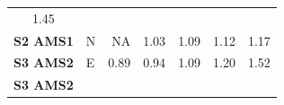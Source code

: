 \documentclass[]{article}
\begin{document}
\begin{longtable}[]{@{}clrrrrr@{}}
\begin{minipage}[t]{0.08\columnwidth}
1.45\strut
\end{minipage}\tabularnewline
\begin{minipage}[t]{0.19\columnwidth}\centering\strut
\textbf{S2 AMS1}\strut
\end{minipage} & \begin{minipage}[t]{0.21\columnwidth}\raggedright\strut
N\strut
\end{minipage} & \begin{minipage}[t]{0.08\columnwidth}\raggedleft\strut
NA\strut
\end{minipage} & \begin{minipage}[t]{0.08\columnwidth}\raggedleft\strut
1.03\strut
\end{minipage} & \begin{minipage}[t]{0.08\columnwidth}\raggedleft\strut
1.09\strut
\end{minipage} & \begin{minipage}[t]{0.08\columnwidth}\raggedleft\strut
1.12\strut
\end{minipage} & \begin{minipage}[t]{0.08\columnwidth}\raggedleft\strut
1.17\strut
\end{minipage}\tabularnewline
\begin{minipage}[t]{0.19\columnwidth}\centering\strut
\textbf{S3 AMS2}\strut
\end{minipage} & \begin{minipage}[t]{0.21\columnwidth}\raggedright\strut
E\strut
\end{minipage} & \begin{minipage}[t]{0.08\columnwidth}\raggedleft\strut
0.89\strut
\end{minipage} & \begin{minipage}[t]{0.08\columnwidth}\raggedleft\strut
0.94\strut
\end{minipage} & \begin{minipage}[t]{0.08\columnwidth}\raggedleft\strut
1.09\strut
\end{minipage} & \begin{minipage}[t]{0.08\columnwidth}\raggedleft\strut
1.20\strut
\end{minipage} & \begin{minipage}[t]{0.08\columnwidth}\raggedleft\strut
1.52\strut
\end{minipage}\tabularnewline
\begin{minipage}[t]{0.19\columnwidth}\centering\strut
\textbf{S3 AMS2}\strut
\end{minipage} & \begin{minipage}[t]{0.21\columnwidth}\raggedright\strut

\end{minipage}
\end{longtable}
\end{document}
